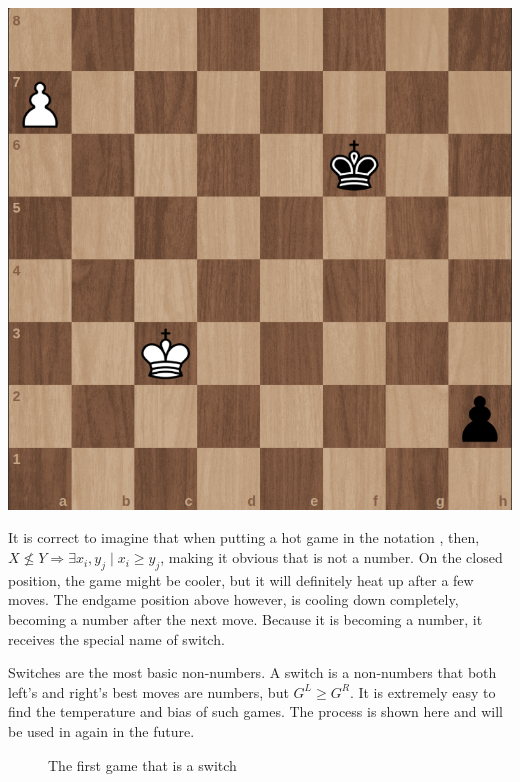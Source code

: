 \begin{center}
	\includegraphics[scale=0.15]{images/chess_hot} 
\end{center}

It is correct to imagine that when putting a hot game \Gm{} in the notation , then, $X \nleq Y \Rightarrow \exists x_i, y_j \mid x_i \ge y_j$, making it obvious that \Gm{} is not a number. On the closed position, the game might be cooler, but it will definitely heat up after a few moves. The endgame position above however, is cooling down completely, becoming a number after the next move. Because it is becoming a number, it receives the special name of switch.

Switches are the most basic non-numbers. A switch is a non-numbers \Gm{} that both left's and right's best moves are numbers, but $G^L \ge G^R$. It is extremely easy to find the temperature and bias of such games. The process is shown here and will be used in again in the future.

\begin{figure} [!ht]
	\begin{center}
	\end{center}
	\caption{The first game that is a switch}
\end{figure}

